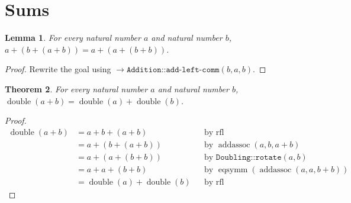 \documentclass[11pt]{article}
\newtheorem{theorem}{Theorem}[section]
\newtheorem{lemma}[theorem]{Lemma}
\theoremstyle{definition}
\begin{document}
\section{Sums}
\label{ll:doubling:sums}
\begin{lemma}
\label{ll:doubling:rotate}
For every natural number \(a\) and natural number \(b\), \(a + (b + (a + b)) = a + (a + (b + b))\).
\end{lemma}
\begin{proof}
Rewrite the goal using \(\rightarrow \texttt{Addition::add-left-comm}(b, a, b)\).
\end{proof}
\begin{theorem}
\label{ll:doubling:double-add}
For every natural number \(a\) and natural number \(b\), \(\operatorname{double}(a + b) = \operatorname{double}(a) + \operatorname{double}(b)\).
\end{theorem}
\begin{proof}
\begin{align*}
\operatorname{double}(a + b) &= a + b + (a + b) && \text{by } \operatorname{rfl} \\
 &= a + (b + (a + b)) && \text{by } \operatorname{addassoc}(a, b, a + b) \\
 &= a + (a + (b + b)) && \text{by } \texttt{Doubling::rotate}(a, b) \\
 &= a + a + (b + b) && \text{by } \operatorname{eqsymm}(\operatorname{addassoc}(a, a, b + b)) \\
 &= \operatorname{double}(a) + \operatorname{double}(b) && \text{by } \operatorname{rfl}
\end{align*}
\end{proof}
\end{document}

